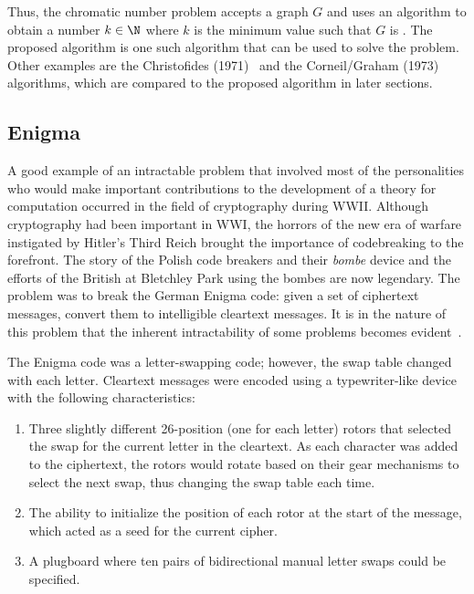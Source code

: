 Thus, the chromatic number problem accepts a graph \(G\) and uses an algorithm to obtain a number \(k\in\N\) where
\(k\) is the minimum value such that \(G\) is .  The proposed algorithm is one such algorithm that can
be used to solve the problem.  Other examples are the Christofides (1971)~\cite{christofides} and the Corneil/Graham
(1973)~\cite{corneil} algorithms, which are compared to the proposed algorithm in later sections.

\subsection{Enigma}\label{sec:sub:enigma}

A good example of an intractable problem that involved most of the personalities who would make important
contributions to the development of a theory for computation occurred in the field of cryptography during WWII.
Although cryptography had been important in WWI, the horrors of the new era of warfare instigated by Hitler's Third
Reich brought the importance of codebreaking to the forefront.  The story of the Polish code breakers and their
\emph{bombe} device and the efforts of the British at Bletchley Park using the bombes are now legendary.  The
problem was to break the German Enigma code: given a set of ciphertext messages, convert them to intelligible
cleartext messages.  It is in the nature of this problem that the inherent intractability of some problems becomes
evident~\cite{dturing}.

The Enigma code was a letter-swapping code; however, the swap table changed with each letter.  Cleartext messages
were encoded using a typewriter-like device with the following characteristics:

\begin{enumerate}
\item Three slightly different 26-position (one for each letter) rotors that selected the swap for the current
  letter in the cleartext.  As each character was added to the ciphertext, the rotors would rotate based on their
  gear mechanisms to select the next swap, thus changing the swap table each time.
\item The ability to initialize the position of each rotor at the start of the message, which acted as a seed for the
  current cipher.
\item A plugboard where ten pairs of bidirectional manual letter swaps could be specified.
\end{enumerate}

